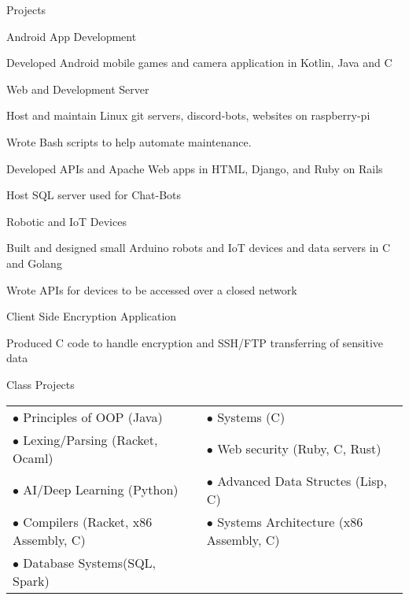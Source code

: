 \documentclass{resume} %
\begin{document}

\begin{rSection}{Projects}

\begin{rSubsection}{Android App Development}{}{}{}
\item Developed Android mobile games and camera application in Kotlin, Java and C
\end{rSubsection}

\begin{rSubsection}{Web and Development Server}{}{}{}
\item Host and maintain Linux git servers, discord-bots, websites on raspberry-pi
\item Wrote Bash scripts to help automate maintenance.
\item Developed APIs and Apache Web apps in HTML, Django, and Ruby on Rails
\item Host SQL server used for Chat-Bots
\end{rSubsection}

\begin{rSubsection}{Robotic and IoT Devices}{}{}{}
\item Built and designed small Arduino robots and IoT devices and data servers in C and Golang
\item Wrote APIs for devices to be accessed over a closed network
\end{rSubsection}

\begin{rSubsection}{Client Side Encryption Application}{}{}{}
\item Produced C code to handle encryption and SSH/FTP transferring of sensitive data
\end{rSubsection}

\begin{rSubsection}{Class Projects}{}{}{}
\begin{tabular}{l l}
$\bullet$ Principles of OOP (Java) &        $\bullet$ Systems (C)\\
$\bullet$ Lexing/Parsing (Racket, Ocaml) &  $\bullet$ Web security (Ruby, C, Rust)\\
$\bullet$ AI/Deep Learning (Python) &       $\bullet$ Advanced Data Structes (Lisp, C) \\
$\bullet$ Compilers (Racket, x86 Assembly, C) & $\bullet$ Systems Architecture (x86 Assembly, C)\\
$\bullet$ Database Systems(SQL, Spark) & 
\end{tabular}
\end{rSubsection}

\end{rSection}
\end{document}
